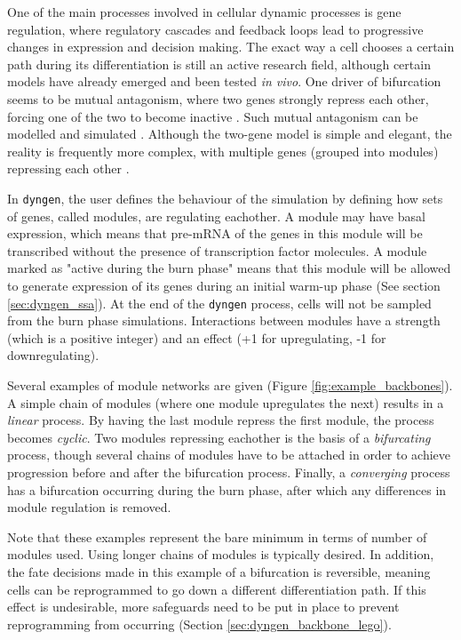 One of the main processes involved in cellular dynamic processes is gene regulation, where regulatory cascades and feedback loops lead to progressive changes in expression and decision making. The exact way a cell chooses a certain path during its differentiation is still an active research field, although certain models have already emerged and been tested \textit{in vivo}. One driver of bifurcation seems to be mutual antagonism, where two genes \cite{xu_regulationbifurcatingcell_2015} strongly repress each other, forcing one of the two to become inactive \cite{graf_forcingcellschange_2009}. Such mutual antagonism can be modelled and simulated \cite{wang_quantifyingwaddingtonlandscape_2011, ferrell_bistabilitybifurcationswaddington_2012}. Although the two-gene model is simple and elegant, the reality is frequently more complex, with multiple genes (grouped into modules) repressing each other \cite{yosef_dynamicregulatorynetwork_2013}.

In \texttt{dyngen}, the user defines the behaviour of the simulation by defining how sets of genes, called modules, are regulating eachother.
A module may have basal expression, which means that pre-mRNA of the genes in this module will be transcribed without the presence of transcription factor molecules. A module marked as "active during the burn phase" means that this module will be allowed to generate expression of its genes during an initial warm-up phase (See section \ref{sec:dyngen_ssa}). At the end of the \texttt{dyngen} process, cells will not be sampled from the burn phase simulations. Interactions between modules have a strength (which is a positive integer) and an effect (+1 for upregulating, -1 for downregulating).

Several examples of module networks are given (Figure \ref{fig:example_backbones}). 
A simple chain of modules (where one module upregulates the next) results in a \emph{linear} process. By having the last module repress the first module, the process becomes \emph{cyclic}. Two modules repressing eachother is the basis of a \emph{bifurcating} process, though several chains of modules have to be attached in order to achieve progression before and after the bifurcation process. Finally, a \emph{converging} process has a bifurcation occurring during the burn phase, after which any differences in module regulation is removed.

Note that these examples represent the bare minimum in terms of number of modules used. Using longer chains of modules is typically desired. In addition, the fate decisions made in this example of a bifurcation is reversible, meaning cells can be reprogrammed to go down a different differentiation path. If this effect is undesirable, more safeguards need to be put in place to prevent reprogramming from occurring (Section \ref{sec:dyngen_backbone_lego}).

